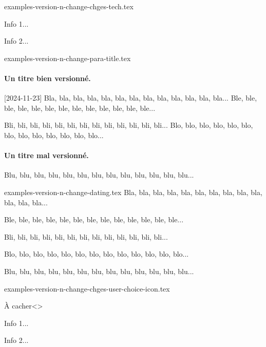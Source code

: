\begin{filecontents*}[overwrite]{examples-version-n-change-chges-tech.tex}
\begin{tdoctech}
    \item Info 1...
    \item Info 2...
\end{tdoctech}
\end{filecontents*}


\begin{filecontents*}[overwrite]{examples-version-n-change-para-title.tex}
\paragraph{Un titre bien versionné.}
[2024-11-23]
Bla, bla, bla, bla, bla, bla, bla, bla, bla, bla, bla, bla, bla...
Ble, ble, ble, ble, ble, ble, ble, ble, ble, ble, ble, ble, ble...

Bli, bli, bli, bli, bli, bli, bli, bli, bli, bli, bli, bli, bli...
Blo, blo, blo, blo, blo, blo, blo, blo, blo, blo, blo, blo, blo...

\paragraph{Un titre mal versionné.}
Blu, blu, blu, blu, blu, blu, blu, blu, blu, blu, blu, blu, blu...
\end{filecontents*}


\begin{filecontents*}[overwrite]{examples-version-n-change-dating.tex}
Bla, bla, bla, bla, bla, bla, bla, bla, bla, bla, bla, bla, bla...

\medskip %

Ble, ble, ble, ble, ble, ble, ble, ble, ble, ble, ble, ble, ble...

\medskip %

Bli, bli, bli, bli, bli, bli, bli, bli, bli, bli, bli, bli, bli...

Blo, blo, blo, blo, blo, blo, blo, blo, blo, blo, blo, blo, blo...

Blu, blu, blu, blu, blu, blu, blu, blu, blu, blu, blu, blu, blu...
\end{filecontents*}


\begin{filecontents*}[overwrite]{examples-version-n-change-chges-user-choice-icon.tex}
\begin{tdoctopic}{À cacher}<\faEyeSlash>
    \item Info 1...
    \item Info 2...
\end{tdoctopic}
\end{filecontents*}


